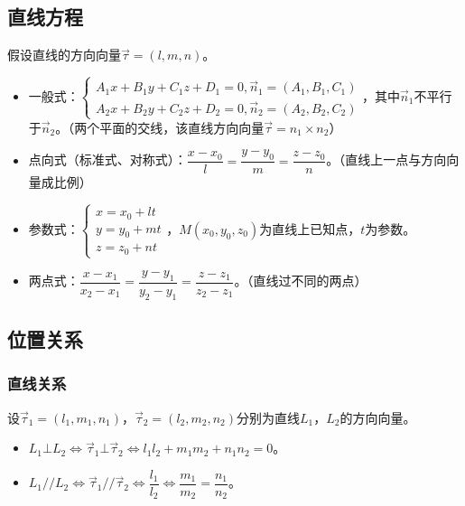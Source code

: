 \subsection{直线方程}

假设直线的方向向量$\vec{\tau}=(l,m,n)$。

\begin{itemize}
    \item 一般式：$\left\{\begin{array}{l}
        A_1x+B_1y+C_1z+D_1=0,\vec{n}_1=(A_1,B_1,C_1) \\
        A_2x+B_2y+C_2z+D_2=0,\vec{n}_2=(A_2,B_2,C_2)
    \end{array}\right.$，其中$\vec{n}_1$不平行于$\vec{n}_2$。（两个平面的交线，该直线方向向量$\vec{\tau}=n_1\times n_2$）
    \item 点向式（标准式、对称式）：$\dfrac{x-x_0}{l}=\dfrac{y-y_0}{m}=\dfrac{z-z_0}{n}$。（直线上一点与方向向量成比例）
    \item 参数式：$\left\{\begin{array}{l}
        x=x_0+lt \\
        y=y_0+mt \\
        z=z_0+nt
    \end{array}\right.$，$M(x_0,y_0,z_0)$为直线上已知点，$t$为参数。
    \item 两点式：$\dfrac{x-x_1}{x_2-x_1}=\dfrac{y-y_1}{y_2-y_1}=\dfrac{z-z_1}{z_2-z_1}$。（直线过不同的两点）
\end{itemize}

\subsection{位置关系}

\subsubsection{直线关系}

设$\vec{\tau}_1=(l_1,m_1,n_1)$，$\vec{\tau}_2=(l_2,m_2,n_2)$分别为直线$L_1$，$L_2$的方向向量。

\begin{itemize}
    \item $L_1\bot L_2\Leftrightarrow\vec{\tau}_1\bot\vec{\tau}_2\Leftrightarrow l_1l_2+m_1m_2+n_1n_2=0$。
    \item $L_1//L_2\Leftrightarrow\vec{\tau}_1//\vec{\tau}_2\Leftrightarrow\dfrac{l_1}{l_2}\Leftrightarrow\dfrac{m_1}{m_2}=\dfrac{n_1}{n_2}$。
\end{itemize}


